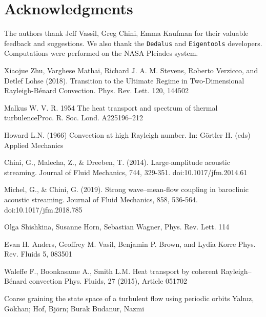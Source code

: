 \documentclass[reprint,amsmath,amssymb,aps]{revtex4-1}
\begin{document}
\section*{Acknowledgments}
The authors thank Jeff Vassil, Greg Chini, Emma Kaufman for their valuable feedback and suggestions. We also thank the \texttt{Dedalus} and \texttt{Eigentools} developers. Computations were performed on the NASA Pleiades system.

% 
\begin{thebibliography}{99} 

 Xiaojue Zhu, Varghese Mathai, Richard J. A. M. Stevens, Roberto Verzicco, and Detlef Lohse (2018). Transition to the Ultimate Regime in Two-Dimensional Rayleigh-Bénard Convection. Phys. Rev. Lett. 120, 144502

 Malkus W. V. R. 1954 The heat transport and spectrum of thermal turbulenceProc. R. Soc. Lond. A225196–212

 Howard L.N. (1966) Convection at high Rayleigh number. In: Görtler H. (eds) Applied Mechanics

 Chini, G., Malecha, Z., \& Dreeben, T. (2014). Large-amplitude acoustic streaming. Journal of Fluid Mechanics, 744, 329-351. doi:10.1017/jfm.2014.61

 Michel, G., \& Chini, G. (2019). Strong wave–mean-flow coupling in baroclinic acoustic streaming. Journal of Fluid Mechanics, 858, 536-564. doi:10.1017/jfm.2018.785

 Olga Shishkina, Susanne Horn, Sebastian Wagner, Phys. Rev. Lett. 114

 Evan H. Anders, Geoffrey M. Vasil, Benjamin P. Brown, and Lydia Korre Phys. Rev. Fluids 5, 083501

 Waleffe F., Boonkasame A., Smith L.M. Heat transport by coherent Rayleigh–Bénard convection Phys. Fluids, 27 (2015), Article 051702

 Coarse graining the state space of a turbulent flow using periodic orbits Yalnız, Gökhan; Hof, Björn; Burak Budanur, Nazmi

\end{thebibliography}
\end{document}
